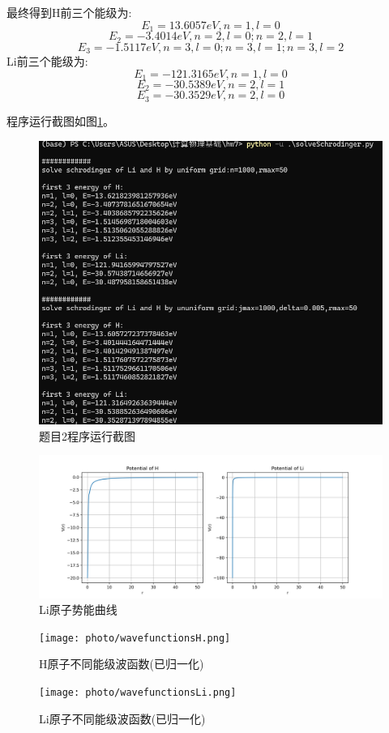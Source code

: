 \documentclass[11pt]{article}
\begin{document}
最终得到H前三个能级为:
\[E_1=13.6057eV ,n=1,l=0
\]
\[
E_2=-3.4014eV ,n=2,l=0;n=2,l=1
\]
\[
E_3=-1.5117eV ,n=3,l=0;n=3,l=1;n=3,l=2
\]
Li前三个能级为:
\[
E_1=-121.3165eV ,n=1,l=0
\]
\[
E_2=-30.5389eV ,n=2,l=1
\]
\[
E_3=-30.3529eV ,n=2,l=0
\]

程序运行截图如图\ref{fig:p2}。

\begin{figure}
  \centering
  \includegraphics[width=0.8\linewidth]{photo/figp2.png}
  \caption{题目2程序运行截图}
  \label{fig:p2}
\end{figure}


\begin{figure}
  \centering
  \includegraphics[width=1\linewidth]{photo/potentialLi.png}
  \caption{Li原子势能曲线}
  \label{fig:potentialLi}
\end{figure}

\begin{figure}
  \centering
  \texttt{[image: photo/wavefunctionsH.png]}
  \caption{H原子不同能级波函数(已归一化)}
  \label{fig:wavefunctionsH}
\end{figure}

\begin{figure}
  \centering
  \texttt{[image: photo/wavefunctionsLi.png]}
  \caption{Li原子不同能级波函数(已归一化)}
  \label{fig:wavefunctionsLi}
\end{figure}
\end{document}

